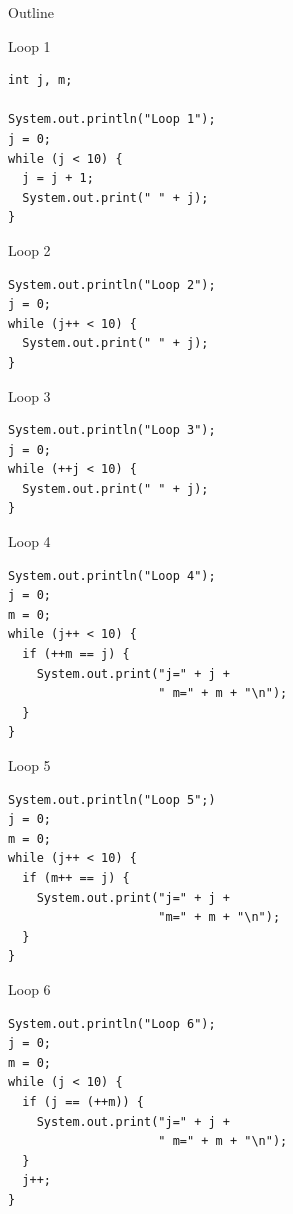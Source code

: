 \begin{frame}{Outline}
  \tableofcontents[current]
\end{frame}

\begin{frame}[fragile]{Loop 1}
  \begin{lstlisting}
int j, m;

System.out.println("Loop 1");
j = 0;
while (j < 10) {
  j = j + 1;
  System.out.print(" " + j);
}
  \end{lstlisting}
\end{frame}

\begin{frame}[fragile]{Loop 2}
  \begin{lstlisting}
System.out.println("Loop 2");
j = 0;
while (j++ < 10) {
  System.out.print(" " + j);
}
  \end{lstlisting}
\end{frame}

\begin{frame}[fragile]{Loop 3}
  \begin{lstlisting}
System.out.println("Loop 3");
j = 0;
while (++j < 10) {
  System.out.print(" " + j);
}
  \end{lstlisting}
\end{frame}

\begin{frame}[fragile]{Loop 4}
  \begin{lstlisting}
System.out.println("Loop 4");
j = 0;
m = 0;
while (j++ < 10) {
  if (++m == j) {
    System.out.print("j=" + j + 
                     " m=" + m + "\n");
  }
}
  \end{lstlisting}
\end{frame}

\begin{frame}[fragile]{Loop 5}
  \begin{lstlisting}
System.out.println("Loop 5";)
j = 0;
m = 0;
while (j++ < 10) {
  if (m++ == j) {
    System.out.print("j=" + j + 
                     "m=" + m + "\n");
  }
}
  \end{lstlisting}
\end{frame}

\begin{frame}[fragile]{Loop 6}
  \begin{lstlisting}
System.out.println("Loop 6");
j = 0;
m = 0;
while (j < 10) {
  if (j == (++m)) {
    System.out.print("j=" + j + 
                     " m=" + m + "\n");
  }
  j++;
}
  \end{lstlisting}
\end{frame}

